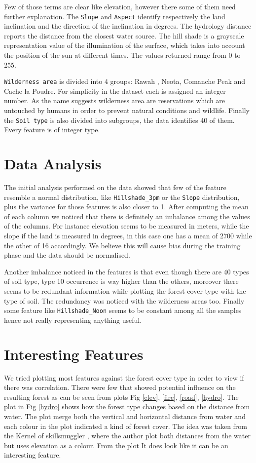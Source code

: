 \documentclass[a4paper, 11pt]{article}
\begin{document}
Few of those terms are clear like elevation, however there some of them need further explanation. The \texttt{Slope} and \texttt{Aspect} identify respectively the land inclination and the direction of the inclination in degrees. The hydrology distance reports the distance from the closest water source. The hill shade is a grayscale representation value of the illumination of the surface, which takes into account the position of the sun at different times. The values returned range from 0 to 255.

\texttt{Wilderness area} is divided into 4 groups: Rawah , Neota, Comanche Peak and Cache la Poudre. For simplicity in the dataset each is assigned an integer number. As the name suggests wilderness area are reservations which are untouched by humans in order to prevent natural conditions and wildlife. Finally the \texttt{Soil type} is also divided into subgroups, the data identifies 40 of them. Every feature is of integer type.

\section*{Data Analysis}
The initial analysis performed on the data showed that few of the feature resemble a normal distribution, like \texttt{Hillshade\_3pm} or the \texttt{Slope} distribution, plus the variance for those features is also closer to 1. After computing the mean of each column we noticed that there is definitely an imbalance among the values of the columns. For instance elevation seems to be measured in meters, while the slope if the land is measured in degrees, in this case one has a mean of 2700 while the other of 16 accordingly. We believe this will cause bias during the training phase and the data should be normalised.

Another imbalance noticed in the features is that even though there are 40 types of soil type, type 10 occurrence is way higher than the others, moreover there seems to be redundant information while plotting the forest cover type with the type of soil. The redundancy was noticed with the wilderness areas too. Finally some feature like \texttt{Hillshade\_Noon} seems to be constant among all the samples hence not really representing anything useful.

\section*{Interesting Features}
We tried plotting most features against the forest cover type in order to view if there was correlation. There were few that showed potential influence on the resulting forest as can be seen from plots Fig \ref{elev}, \ref{fire}, \ref{road}, \ref{hydro}. The plot in Fig \ref{hydro} shows how the forest type changes based on the distance from water. The plot merge both the vertical and horizontal distance from water and each colour in the plot indicated a kind of forest cover. The idea was taken from the Kernel of skillsmuggler \cite{skill}, where the author plot both distances from the water but uses elevation as a colour. From the plot It does look like it can be an interesting feature.
\end{document}
